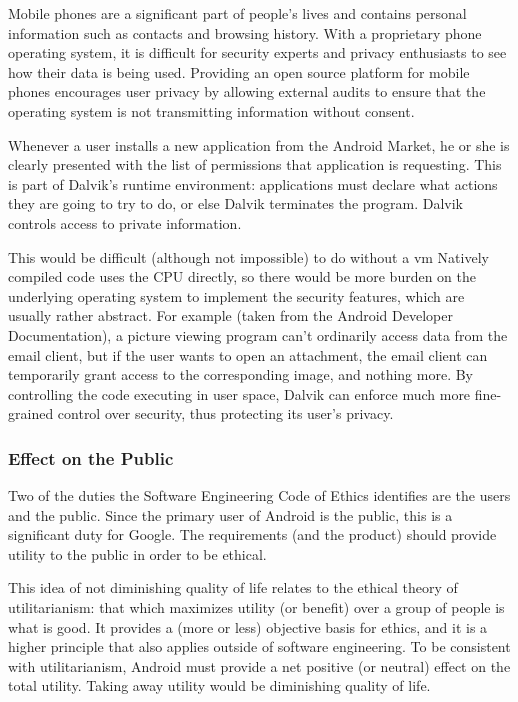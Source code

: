 \documentclass[11pt]{article}
\begin{document}
\begin{multicols}{2}
Mobile phones are a significant part of people's lives and contains personal
information such as contacts and browsing history.  With a proprietary phone
operating system, it is difficult for security experts and privacy enthusiasts
to see how their data is being used.  Providing an open source platform for
mobile phones encourages user privacy by allowing external audits to ensure that
the operating system is not transmitting information without consent.

Whenever a user installs a new application from the Android Market, he or she is
clearly presented with the list of permissions that application is requesting.
This is part of Dalvik's runtime environment: applications must declare what
actions they are going to try to do, or else Dalvik terminates the program.
Dalvik controls access to private information.

This would be difficult (although not impossible) to do without a \gls{vm}
Natively compiled code uses the CPU directly, so there would be more burden on
the underlying operating system to implement the security features, which are
usually rather abstract.  For example (taken from the Android Developer
Documentation), a picture viewing program can't ordinarily access data from the
email client, but if the user wants to open an attachment, the email client can
temporarily grant access to the corresponding image, and nothing more.  By
controlling the code executing in user space, Dalvik can enforce much more
fine-grained control over security, thus protecting its user's privacy.


\subsubsection{Effect on the Public} %
\label{ssub:public-effect}

Two of the duties the Software Engineering Code of Ethics identifies are the
users and the public.  Since the primary user of Android is the public, this is
a significant duty for Google.  The requirements (and the product) should
provide utility to the public in order to be ethical.

This idea of not diminishing quality of life relates to the ethical theory of
utilitarianism: that which maximizes utility (or benefit) over a group of people
is what is good.  It provides a (more or less) objective basis for ethics, and
it is a higher principle that also applies outside of software engineering.  To
be consistent with utilitarianism, Android must provide a net positive (or
neutral) effect on the total utility.  Taking away utility would be diminishing
quality of life.


\end{multicols}
\end{document}
